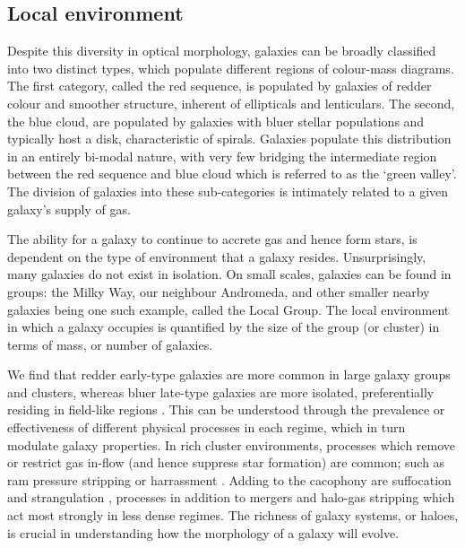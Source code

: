 \subsection{Local environment}
 Despite this diversity in optical morphology, galaxies can be broadly classified into two distinct types, which populate different regions of colour-mass diagrams. The first category, called the red sequence, is populated by galaxies of redder colour and smoother structure, inherent of ellipticals and lenticulars. The second, the blue cloud, are populated by galaxies with bluer stellar populations and typically host a disk, characteristic of spirals. Galaxies populate this distribution in an entirely bi-modal nature, with very few bridging the intermediate region between the red sequence and blue cloud which is referred to as the `green valley'. The division of galaxies into these sub-categories is intimately related to a given galaxy's supply of gas. 

The ability for a galaxy to continue to accrete gas and hence form stars, is dependent on the type of environment that a galaxy resides. Unsurprisingly, many galaxies do not exist in isolation. On small scales, galaxies can be found in groups: the Milky Way, our neighbour Andromeda, and other smaller nearby galaxies being one such example, called the Local Group. The local environment in which a galaxy occupies is quantified by the size of the group (or cluster) in terms of mass, or number of galaxies.

We find that redder early-type galaxies are more common in large galaxy groups and clusters, whereas bluer late-type galaxies are more isolated, preferentially residing in field-like regions \citep[e.g.][]{dressler1980, whitmore1993}. This can be understood through the prevalence or effectiveness of different physical processes in each regime, which in turn modulate galaxy properties. In rich cluster environments, processes which remove or restrict gas in-flow (and hence suppress star formation) are common; such as ram pressure stripping \citep[e.g.][]{gunn1972} or harrassment \citep[e.g.][]{moore1996}. Adding to the cacophony are suffocation and strangulation \citep[e.g.][]{larson1980}, processes in addition to mergers and halo-gas stripping which act most strongly in less dense regimes. The richness of galaxy systems, or haloes, is crucial in understanding how the morphology of a galaxy will evolve.

